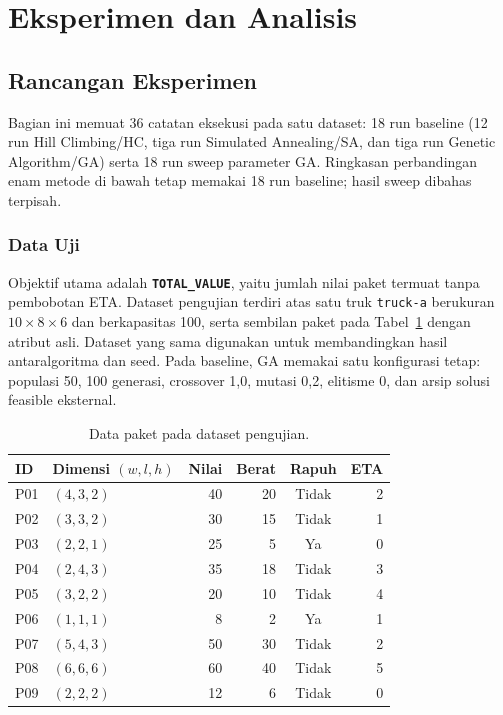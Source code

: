 \documentclass[12pt,a4paper]{article}
\begin{document}
\clearpage
\section{Eksperimen dan Analisis}
\subsection{Rancangan Eksperimen}
Bagian ini memuat 36 catatan eksekusi pada satu dataset: 18 run baseline (12 run Hill Climbing/HC, tiga run Simulated Annealing/SA, dan tiga run Genetic Algorithm/GA) serta 18 run sweep parameter GA. Ringkasan perbandingan enam metode di bawah tetap memakai 18 run baseline; hasil sweep dibahas terpisah.

\subsubsection{Data Uji}
Objektif utama adalah \textbf{\texttt{TOTAL\_VALUE}}, yaitu jumlah nilai paket termuat tanpa pembobotan ETA. Dataset pengujian terdiri atas satu truk \texttt{truck-a} berukuran $10\times8\times6$ dan berkapasitas 100, serta sembilan paket pada Tabel~\ref{tab:data-eksperimen} dengan atribut asli. Dataset yang sama digunakan untuk membandingkan hasil antaralgoritma dan seed. Pada baseline, GA memakai satu konfigurasi tetap: populasi 50, 100 generasi, crossover 1,0, mutasi 0,2, elitisme 0, dan arsip solusi feasible eksternal.

\begin{table}[htbp]
    \centering
    \small
    \renewcommand{\arraystretch}{1.15}
    \begin{tabularx}{\textwidth}{@{}l X r r c r@{}}
        \toprule
        ID & Dimensi $(w,l,h)$ & Nilai & Berat & Rapuh & ETA \\
        \midrule
        P01 & $(4,3,2)$ & 40 & 20 & Tidak & 2 \\
        P02 & $(3,3,2)$ & 30 & 15 & Tidak & 1 \\
        P03 & $(2,2,1)$ & 25 & 5 & Ya & 0 \\
        P04 & $(2,4,3)$ & 35 & 18 & Tidak & 3 \\
        P05 & $(3,2,2)$ & 20 & 10 & Tidak & 4 \\
        P06 & $(1,1,1)$ & 8 & 2 & Ya & 1 \\
        P07 & $(5,4,3)$ & 50 & 30 & Tidak & 2 \\
        P08 & $(6,6,6)$ & 60 & 40 & Tidak & 5 \\
        P09 & $(2,2,2)$ & 12 & 6 & Tidak & 0 \\
        \bottomrule
    \end{tabularx}
    \caption{Data paket pada dataset pengujian.}
    \label{tab:data-eksperimen}
\end{table}
\end{document}
